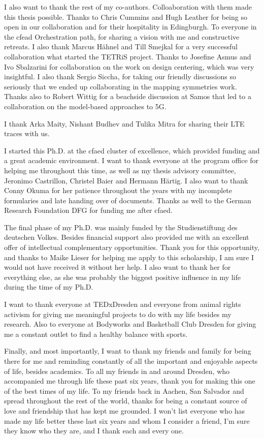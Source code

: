 I also want to thank the rest of my co-authors. Colloaboration with them made this thesis possible.
Thanks to Chris Cummins and Hugh Leather for being so open in our collaboration and for their hospitality in Edingburgh. 
To everyone in the cfead Orchestration path, for sharing a vision with me and constructive retreats.
I also thank Marcus Hähnel and Till Smejkal for a very successful collaboration what started the \acs*{TETRiS} project.
Thanks to Josefine Asmus and Ivo Sbalzarini for collaboration on the work on design centering, which was very insightful.
I also thank Sergio Siccha, for taking our friendly discussions so seriously that we ended up collaborating in the mapping symmetries work.
Thanks also to Robert Wittig for a beachside discussion at Samos that led to a collaboration on the model-based approaches to 5G.

I thank Arka Maity, Nishant Budhev and Tulika Mitra for sharing their LTE traces with us.

I started this Ph.D. at the \ac{cfaed} cluster of excellence, which provided funding and a great academic environment.
I want to thank everyone at the program office for helping me throughout this time, as well as my thesis advisory committee, Jeronimo Castrillon, Christel Baier and Hermann Härtig.
I also want to thank Conny Okuma for her patience throughout the years with my incomplete formularies and late handing over of documents.
Thanks as well to the German Research Foundation DFG for funding me after \ac{cfaed}.

The final phase of my Ph.D. was mainly funded by the Studienstiftung des deutschen Volkes.
Besides financial support also provided me with an excellent offer of intellectual complementary opportunities.
Thank you for this opportunity, and thanks to Maike Lieser for helping me apply to this scholarship, I am sure I would not have received it without her help.
I also want to thank her for everything else, as she was probably the biggest positive influence in my life during the time of my Ph.D.

I want to thank everyone at TEDxDresden and everyone from animal rights activism for giving me meaningful projects to do with my life besides my research. 
Also to everyone at Bodyworks and Basketball Club Dresden for giving me a constant outlet to find a healthy balance with sports.

Finally, and most importantly, I want to thank my friends and family for being there for me and reminding constantly of all the important and enjoyable aspects of life, besides academics.
To all my friends in and around Dresden, who accompanied me through life these past six years, thank you for making this one of the best times of my life. 
To my friends back in Aachen, San Salvador and spread throughout the rest of the world, thanks for being a constant source of love and friendship that has kept me grounded.
I won't list everyone who has made my life better these last six years and whom I consider a friend, I'm sure they know who they are, and I thank each and every one.

